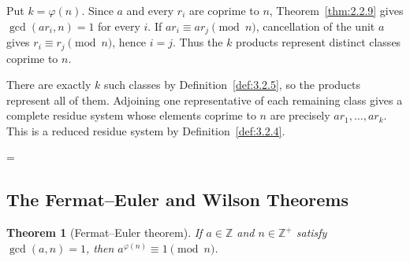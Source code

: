 \documentclass[11pt]{article}
\makeatletter
\theoremstyle{ntstyle}
\newtheorem{theorem}{Theorem}[subsection]
\let\nt@closedisplay\]
\def\nt@guardedclose{\@ifnextchar\par{\nt@closeafterpar}{\@ifnextchar\end{\postdisplaypenalty\@M\nt@closedisplay}{\nt@closedisplay}}}
\def\nt@closeafterpar\par{\@ifnextchar\par{\nt@closeafterpar}{\@ifnextchar\end{\postdisplaypenalty\@M\nt@closedisplay\par}{\nt@closedisplay\par}}}
\renewenvironment{proof}[1][\proofname]{\par
  \pushQED{\qed}\normalfont\topsep\medskipamount\edef\nt@afterproof{\@endparpenalty=\the\@endparpenalty\relax}\@beginparpenalty\@M\@endparpenalty\@M\let\]\nt@guardedclose\trivlist\item[]\textit{#1\@addpunct{.}} \ignorespaces}{\ifvmode\addpenalty\@M\fi\popQED\nt@afterproof\endtrivlist\@endpefalse}
\makeatother
\begin{document}
\begin{proof}
Put $k=\varphi(n)$. Since $a$ and every $r_i$ are coprime to $n$,
    Theorem~\ref{thm:2.2.9} gives $\gcd(ar_i,n)=1$ for every $i$.
    If $ar_i\equiv ar_j\pmod n$, cancellation of the unit $a$ gives
    $r_i\equiv r_j\pmod n$, hence $i=j$. Thus the $k$ products represent
    distinct classes coprime to $n$.

    There are exactly $k$ such classes by Definition~\ref{def:3.2.5}, so
    the products represent all of them. Adjoining one representative
    of each remaining class gives a complete residue system whose
    elements coprime to $n$ are precisely $ar_1,\ldots,ar_k$.
    This is a reduced residue system by Definition~\ref{def:3.2.4}.

\end{proof}
\subsection{The Fermat--Euler and Wilson Theorems}

\begin{theorem}[Fermat--Euler theorem]\label{thm:3.3.1} If $a \in \mathbb{Z}$
	and $n \in \mathbb{Z}^+$ satisfy $\gcd(a, n)=1$, then $a^{\varphi(n)} \equiv
		1 \pmod{n}$.

\end{theorem}
\end{document}
